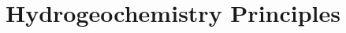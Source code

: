 \documentclass[ppgc,mestrado,English]{iiufrgs}
\begin{document}





\section{Hydrogeochemistry Principles}
\end{document}
